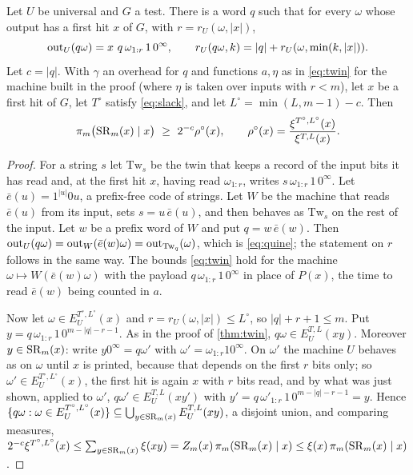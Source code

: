 \begin{theorem}\label{thm:quine}
Let $U$ be universal and $G$ a test. There is a word $q$ such that for every $\omega$ whose output has a first
hit $x$ of $G$, with $r=r_U(\omega,|x|)$,
\begin{equation}\label{eq:quine}
\mathrm{out}_U(q\omega)=x\ q\,\omega_{1:r}\,1\,0^\infty,\qquad r_U(q\omega,k)=|q|+r_U(\omega,\min(k,|x|)) .
\end{equation}
Let $c=|q|$. With $\gamma$ an overhead for $q$ and functions $a,\eta$ as in \eqref{eq:twin} for the machine
built in the proof (where $\eta$ is taken over inputs with $r<m$), let $x$ be a first hit of $G$, let $T^\circ$
satisfy \eqref{eq:slack}, and let $L^\circ=\min(L,m-1)-c$. Then
\[
\pi_m\bigl(\SR_m(x)\mid x\bigr)\ \ge\ 2^{-c}\rho^\circ(x),\qquad
\rho^\circ(x)=\frac{\xi^{T^\circ,L^\circ}(x)}{\xi^{T,L}(x)} .
\]
\end{theorem}
\begin{proof}
For a string $s$ let $\mathrm{Tw}_s$ be the twin that keeps a record of the input bits it has read and, at the
first hit $x$, having read $\omega_{1:r}$, writes $s\,\omega_{1:r}\,1\,0^\infty$. Let $\bar e(u)=1^{|u|}0u$, a
prefix-free code of strings. Let $W$ be the machine that reads $\bar e(u)$ from its input, sets
$s=u\,\bar e(u)$, and then behaves as $\mathrm{Tw}_s$ on the rest of the input. Let $w$ be a prefix word of $W$
and put $q=w\,\bar e(w)$. Then $\mathrm{out}_U(q\omega)=\mathrm{out}_W(\bar e(w)\omega)=\mathrm{out}_{\mathrm{Tw}_q}(\omega)$, which is
\eqref{eq:quine}; the statement on $r$ follows in the same way. The bounds \eqref{eq:twin} hold for the
machine $\omega\mapsto W(\bar e(w)\omega)$ with the payload $q\,\omega_{1:r}\,1\,0^\infty$ in place of $P(x)$,
the time to read $\bar e(w)$ being counted in $a$.

Now let $\omega\in E_U^{T^\circ,L^\circ}(x)$ and $r=r_U(\omega,|x|)\le L^\circ$, so $|q|+r+1\le m$. Put
$y=q\,\omega_{1:r}\,1\,0^{m-|q|-r-1}$. As in the proof of \cref{thm:twin}, $q\omega\in E_U^{T,L}(xy)$. Moreover
$y\in\mathrm{SR}_m(x)$: write $y0^\infty=q\omega'$ with $\omega'=\omega_{1:r}10^\infty$. On $\omega'$ the machine $U$
behaves as on $\omega$ until $x$ is printed, because that depends on the first $r$ bits only; so
$\omega'\in E_U^{T^\circ,L^\circ}(x)$, the first hit is again $x$ with $r$ bits read, and by what was just
shown, applied to $\omega'$, $q\omega'\in E_U^{T,L}(xy')$ with $y'=q\,\omega'_{1:r}\,1\,0^{m-|q|-r-1}=y$.
Hence $\{q\omega:\omega\in E_U^{T^\circ,L^\circ}(x)\}\subseteq\bigcup_{y\in\mathrm{SR}_m(x)}E_U^{T,L}(xy)$, a disjoint
union, and comparing measures,
$2^{-c}\xi^{T^\circ,L^\circ}(x)\le\sum_{y\in\mathrm{SR}_m(x)}\xi(xy)=Z_m(x)\,\pi_m(\mathrm{SR}_m(x)\mid x)\le\xi(x)\,\pi_m(\mathrm{SR}_m(x)\mid x)$.
\end{proof}

